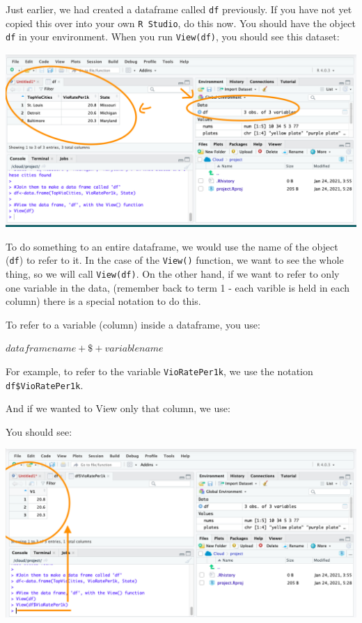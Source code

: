 \documentclass[
]{book}
\newenvironment{Shaded}{\begin{snugshade}}{\end{snugshade}}
\newcommand{\FunctionTok}[1]{\textcolor[rgb]{0.00,0.00,0.00}{#1}}
\newcommand{\NormalTok}[1]{#1}
\newcommand{\SpecialCharTok}[1]{\textcolor[rgb]{0.00,0.00,0.00}{#1}}
\begin{document}
Just earlier, we had created a dataframe called \texttt{df} previously. If you have not yet copied this over into your own \texttt{R\ Studio}, do this now. You should have the object \texttt{df} in your environment. When you run \texttt{View(df)}, you should see this dataset:

\includegraphics{img/df_view.png}

To do something to an entire dataframe, we would use the name of the object (\texttt{df}) to refer to it. In the case of the \texttt{View()} function, we want to see the whole thing, so we will call \texttt{View(df)}. On the other hand, if we want to refer to only one variable in the data, (remember back to term 1 - each varible is held in each column) there is a special notation to do this.

To refer to a variable (column) inside a dataframe, you use:

\(dataframe name + \$ + variable name\)

For example, to refer to the variable \texttt{VioRatePer1k}, we use the notation \texttt{df\$VioRatePer1k}.

And if we wanted to View only that column, we use:

\begin{Shaded}
\end{Shaded}

You should see:

\includegraphics{img/view_col_only.png}
\end{document}
